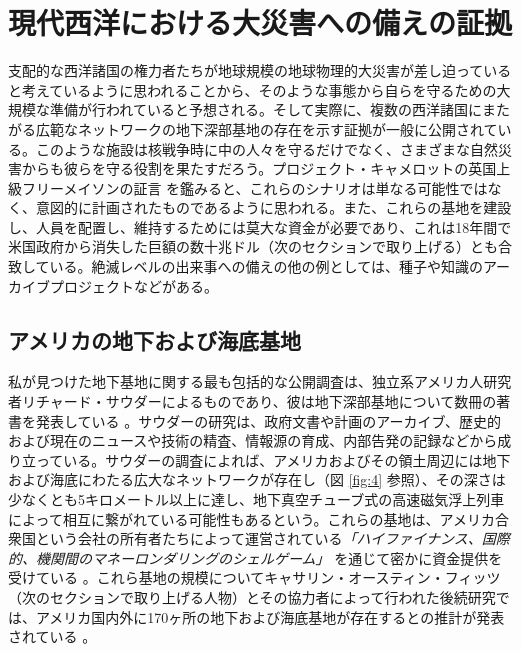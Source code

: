\documentclass[10pt,twocolumn,letterpaper]{article}
\begin{document}

\section{現代西洋における大災害への備えの証拠}

支配的な西洋諸国の権力者たちが地球規模の地球物理的大災害が差し迫っていると考えているように思われることから、そのような事態から自らを守るための大規模な準備が行われていると予想される。そして実際に、複数の西洋諸国にまたがる広範なネットワークの地下深部基地の存在を示す証拠が一般に公開されている。このような施設は核戦争時に中の人々を守るだけでなく、さまざまな自然災害からも彼らを守る役割を果たすだろう。プロジェクト・キャメロットの英国上級フリーメイソンの証言 \cite{4,6} を鑑みると、これらのシナリオは単なる可能性ではなく、意図的に計画されたものであるように思われる。また、これらの基地を建設し、人員を配置し、維持するためには莫大な資金が必要であり、これは18年間で米国政府から消失した巨額の数十兆ドル（次のセクションで取り上げる）\cite{11,12,13}とも合致している。絶滅レベルの出来事への備えの他の例としては、種子や知識のアーカイブプロジェクトなどがある。

\subsection{アメリカの地下および海底基地}

私が見つけた地下基地に関する最も包括的な公開調査は、独立系アメリカ人研究者リチャード・サウダーによるものであり、彼は地下深部基地について数冊の著書を発表している \cite{22}。サウダーの研究は、政府文書や計画のアーカイブ、歴史的および現在のニュースや技術の精査、情報源の育成、内部告発の記録などから成り立っている。サウダーの調査によれば、アメリカおよびその領土周辺には地下および海底にわたる広大なネットワークが存在し（図 \ref{fig:4} 参照）、その深さは少なくとも5キロメートル以上に達し、地下真空チューブ式の高速磁気浮上列車によって相互に繋がれている可能性もあるという。これらの基地は、アメリカ合衆国という会社の所有者たちによって運営されている\textit{「ハイファイナンス、国際的、機関間のマネーロンダリングのシェルゲーム」} を通じて密かに資金提供を受けている \cite{22}。これら基地の規模についてキャサリン・オースティン・フィッツ（次のセクションで取り上げる人物）とその協力者によって行われた後続研究では、アメリカ国内外に170ヶ所の地下および海底基地が存在するとの推計が発表されている \cite{16,20}。
\end{document}
